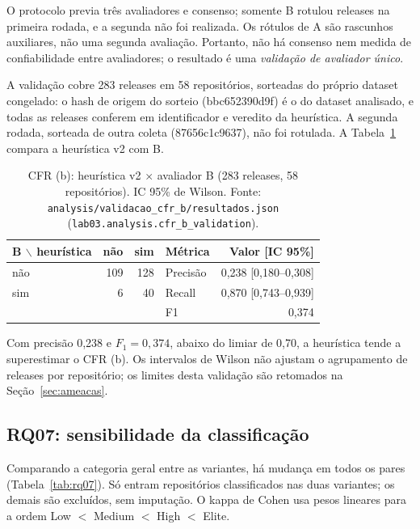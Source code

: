 O protocolo previa três avaliadores e consenso; somente B rotulou releases na
primeira rodada, e a segunda não foi realizada. Os rótulos de A são rascunhos
auxiliares, não uma segunda avaliação. Portanto, não há consenso nem medida de
confiabilidade entre avaliadores; o resultado é uma
\emph{validação de avaliador único}.

A validação cobre 283 releases em 58 repositórios, sorteadas do próprio dataset
congelado: o hash de origem do sorteio (bbc652390d9f) é o do dataset analisado,
e todas as releases conferem em identificador e veredito da heurística. A
segunda rodada, sorteada de outra coleta (87656c1c9637), não foi rotulada.
\noindent A Tabela~\ref{tab:validacao-cfrb} compara a heurística v2 com B.

\begin{table}[ht]
\centering
\caption{CFR (b): heurística v2 $\times$ avaliador B (283 releases, 58 repositórios).
IC 95\% de Wilson. Fonte: \texttt{analysis/validacao\_cfr\_b/resultados.json}
(\texttt{lab03.analysis.cfr\_b\_validation}).}
\label{tab:validacao-cfrb}
\small
\begin{tabular}{lrr|lr}
\hline
B $\backslash$ heurística & não & sim & Métrica & Valor [IC 95\%] \\
\hline
não & 109 & 128 & Precisão & 0,238 [0,180--0,308] \\
sim & 6 & 40 & Recall & 0,870 [0,743--0,939] \\
 & & & F1 & 0,374 \\
\hline
\end{tabular}
\end{table}

Com precisão 0,238 e $F_1 = 0,374$, abaixo do limiar de 0,70, a heurística
tende a superestimar o CFR (b). Os intervalos de Wilson não ajustam o
agrupamento de releases por repositório; os limites desta validação são
retomados na Seção~\ref{sec:ameacas}.

\subsection{RQ07: sensibilidade da classificação}

Comparando a categoria geral entre as variantes, há mudança em todos os pares
(Tabela~\ref{tab:rq07}). Só entram repositórios classificados nas duas
variantes; os demais são excluídos, sem imputação. O kappa de Cohen usa pesos
lineares para a ordem Low $<$ Medium $<$ High $<$ Elite.

